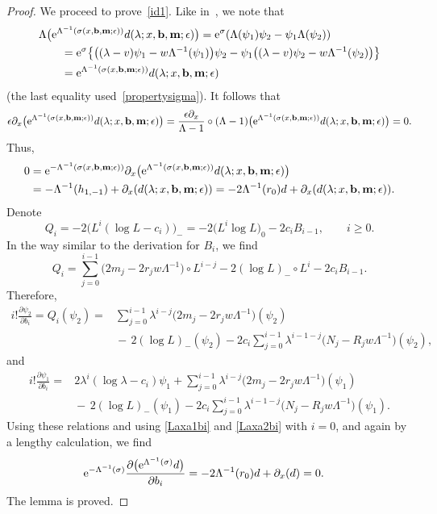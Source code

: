 \documentclass[pdftex]{sigma}
\newcommand{\e}{\epsilon}
\newcommand{\p}{\partial}
\newcommand{\nn}{\nonumber}
\numberwithin{equation}{section}
\begin{document}
\begin{proof}
We proceed to prove~\eqref{id1}. Like in~\cite{Y}, we note that
\begin{align*}
&\Lambda \bigl({\rm e}^{\Lambda^{-1}(\sigma(x,{\bf b},{\bf m};\e))}d(\lambda; x,{\bf b}, {\bf m};\e)\bigr)
 = {\rm e}^{\sigma} (\Lambda(\psi_1) \psi_2
- \psi_1 \Lambda( \psi_2) ) \nn\\
&\qquad{} = {\rm e}^{\sigma} \bigl\{ \bigl((\lambda-v) \psi_1 - w \Lambda^{-1}(\psi_1)\bigr) \psi_2 - \psi_1 \bigl((\lambda-v) \psi_2 - w \Lambda^{-1}(\psi_2)\bigr) \bigr\} \nn\\
&\qquad{} = {\rm e}^{\Lambda^{-1}(\sigma(x, {\bf b},{\bf m};\e))}d(\lambda; x,{\bf b}, {\bf m};\e) \nn
\end{align*}
(the last equality used~\eqref{propertysigma}).
It follows that
\[
\e\p_x \bigl({\rm e}^{\Lambda^{-1}(\sigma(x,{\bf b},{\bf m};\e))}d(\lambda; x, {\bf b}, {\bf m};\e)\bigr)
= \frac{\e\p_x}{\Lambda-1} \circ (\Lambda-1) \bigl({\rm e}^{\Lambda^{-1}(\sigma(x, {\bf b},{\bf m};\e))}
d(\lambda; x, {\bf b}, {\bf m};\e)\bigr) = 0.
\]
Thus,
\begin{align}
0 & = {\rm e}^{-\Lambda^{-1}(\sigma(x,{\bf b},{\bf m};\e))} \p_x \bigl({\rm e}^{\Lambda^{-1}(\sigma(x,{\bf b},{\bf m};\e))}d(\lambda; x, {\bf b}, {\bf m};\e)\bigr) \nn\\
& = - \Lambda^{-1}(h_{1,-1}) + \p_x(d(\lambda; x, {\bf b}, {\bf m};\e)) = - 2\Lambda^{-1}(r_0)d + \p_x(d(\lambda; x, {\bf b}, {\bf m};\e))\nn.
\end{align}
Denote
\[
Q_i = -2 \bigl(L^i(\log L-c_i)\bigr)_- = -2 \bigl(L^i \log L\bigr)_0-2c_i B_{i-1}, \qquad i\ge0.
\]
In the way similar to the derivation for $B_i$, we find
\[
Q_i= \sum_{j=0}^{i-1} \bigl(2m_j-2r_jw\Lambda^{-1}\bigr) \circ L^{i-j} - 2 (\log L)_- \circ L^i - 2c_i B_{i-1}.
\]
Therefore,
\begin{align*}%
i! \frac{\p \psi_2}{\p b_i} = Q_i (\psi_2)={}&{}
 \sum_{j=0}^{i-1} \lambda^{i-j} \bigl(2m_j-2r_jw\Lambda^{-1}\bigr) (\psi_2)\\
&{}{-}\, 2 (\log L)_- (\psi_2)
-2c_i\sum_{j=0}^{i-1} \lambda^{i-1-j} \bigl(N_j-R_j w\Lambda^{-1}\bigr) (\psi_2),\nn
\end{align*}
and
\begin{align*}%
i! \frac{\p \psi_1}{\p b_i} %
={}&{}2 \lambda^i(\log\lambda-c_i) \psi_1+ \sum_{j=0}^{i-1} \lambda^{i-j} \bigl(2m_j-2r_jw\Lambda^{-1}\bigr) (\psi_1)\\
&{}{-}\, 2 (\log L)_- (\psi_1)
-2c_i\sum_{j=0}^{i-1} \lambda^{i-1-j} \bigl(N_j-R_j w\Lambda^{-1}\bigr) (\psi_1).\nn
\end{align*}
Using these relations and using \eqref{Laxa1bi} and \eqref{Laxa2bi} with $i=0$, and again by a lengthy calculation, we find
\begin{align}
& {\rm e}^{-\Lambda^{-1}(\sigma)}\frac{\p \bigl({\rm e}^{\Lambda^{-1}(\sigma)}d\bigr)}{\p b_i}
= - 2\Lambda^{-1}(r_0)d + \p_x(d) = 0. \nn
\end{align}
The lemma is proved.
\end{proof}
\end{document}
